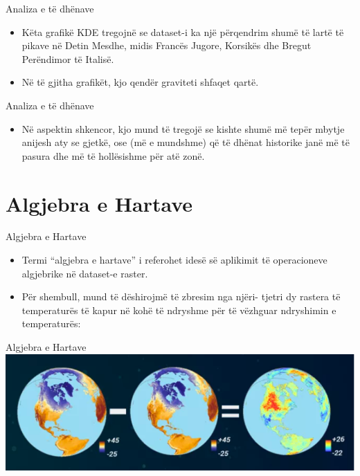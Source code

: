 \documentclass[
  ignorenonframetext,
]{beamer}
\providecommand{\tightlist}{%
  \setlength{\itemsep}{0pt}\setlength{\parskip}{0pt}}
\begin{document}
\begin{frame}{Analiza e të dhënave}
\protect\hypertarget{analiza-e-tuxeb-dhuxebnave}{}
\begin{itemize}
\item
  Këta grafikë KDE tregojnë se dataset-i ka një përqendrim shumë të
  lartë të pikave në Detin Mesdhe, midis Francës Jugore, Korsikës dhe
  Bregut Perëndimor të Italisë.
\item
  Në të gjitha grafikët, kjo qendër graviteti shfaqet qartë.
\end{itemize}
\end{frame}

\begin{frame}{Analiza e të dhënave}
\protect\hypertarget{analiza-e-tuxeb-dhuxebnave-1}{}
\begin{itemize}
\tightlist
\item
  Në aspektin shkencor, kjo mund të tregojë se kishte shumë më tepër
  mbytje anijesh aty se gjetkë, ose (më e mundshme) që të dhënat
  historike janë më të pasura dhe më të hollësishme për atë zonë.
\end{itemize}
\end{frame}

\hypertarget{algjebra-e-hartave}{%
\section{Algjebra e Hartave}\label{algjebra-e-hartave}}

\begin{frame}{Algjebra e Hartave}
\protect\hypertarget{algjebra-e-hartave-1}{}
\begin{itemize}
\item
  Termi ``algjebra e hartave'' i referohet idesë së aplikimit të
  operacioneve algjebrike në dataset-e raster.
\item
  Për shembull, mund të dëshirojmë të zbresim nga njëri- tjetri dy
  rastera të temperaturës të kapur në kohë të ndryshme për të vëzhguar
  ndryshimin e temperaturës:
\end{itemize}
\end{frame}

\begin{frame}{Algjebra e Hartave}
\protect\hypertarget{algjebra-e-hartave-2}{}
\includegraphics{./Figs/map_algebra1.png}
\end{frame}
\end{document}
